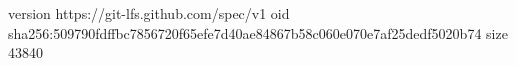 version https://git-lfs.github.com/spec/v1
oid sha256:509790fdffbc7856720f65efe7d40ae84867b58c060e070e7af25dedf5020b74
size 43840
